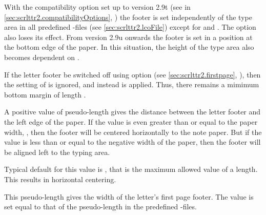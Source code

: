 With the compatibility option
set up to version
2.9t (see
 in
\autoref{sec:scrlttr2.compatibilityOptions},
) the footer is set independently of the
type area in all predefined
-files
(see \autoref{sec:scrlttr2.lcoFile}) except for  and
. The option %
 also loses its
effect. From version 2.9u onwards the
footer is set in a position at the bottom edge of the paper. In this
situation, the height of the type area also becomes dependent on
.

If the letter footer be switched off using option
%
%
(see \autoref{sec:scrlttr2.firstpage},
), then the setting of
 is ignored, and instead
 is applied.  Thus, there remains
a mimimum bottom margin of length .%
%
\EndIndexGroup


\begin{Declaration}
\end{Declaration}
%
A positive value of pseudo-length 
gives the distance between the letter footer and the left edge of the
paper. If the value is even greater than or equal to the paper width,
, then the footer will be centered
horizontally to the note paper. But if the value is less than or equal to the
negative width of the paper, then the footer will be aligned left to the
typing area.

Typical default for this value is ,
that is the maximum allowed value of a length. This results in horizontal
centering.%
\EndIndexGroup


\begin{Declaration}
\end{Declaration}
This pseudo-length gives the width of the letter's first page footer. The
value is set equal to that of the pseudo-length
%
 in the predefined
-files.%
%
\EndIndexGroup
%
\EndIndexGroup
%
\EndIndexGroup


